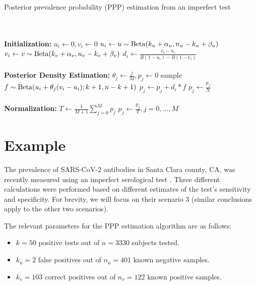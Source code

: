 \documentclass[dvipdfmx]{article}
\begin{document}
\begin{algorithm}[H]
  \caption{Posterior prevalence probability (PPP) estimation from an imperfect test}
  \label{alg:PPP}
    \begin{algorithmic}[1]
       \\ \\
      {\bf Initialization:}
      \State $u_i\gets 0, v_i\gets 0$
      \State $u_i \gets u \sim \operatorname{Beta}(k_u + \alpha_u, n_u-k_u+\beta_u)$
      \State $v_i \gets v \sim \operatorname{Beta}(k_v + \alpha_v, n_v-k_v+\beta_v)$
      \EndWhile
      \State $d_i \gets \frac{v_i-u_i}{B(1-u_i) - B(1-v_i)}$
      \EndFor \\\\
      {\bf Posterior Density Estimation:}
      \State $\theta_j\gets \frac{j}{M}, p_j\gets 0$
      \State sample $f \sim \operatorname{Beta}(u_i + \theta_j(v_i-u_i); k+1, n-k+1)$
      \State $p_j \gets p_j + d_i*f$
      \EndFor
      \State $p_j \gets \frac{p_j}{N}$
      \EndFor \\\\
      {\bf Normalization:}
      \State $T \gets \frac1{M+1}\sum_{j=0}^M p_j$
      \State $p_j\gets \frac{p_j}{T}, j=0,\dots,M$
    \end{algorithmic}
\end{algorithm}

\section{Example}
The prevalence of SARS-CoV-2 antibodies in Santa Clara county, CA, was
recently measured using an imperfect serological test
\cite{Bendavid2020.04.14.20062463}. Three different calculations were
performed based on different estimates of the test's sensitivity and
specificity. For brevity, we will focus on their scenario 3 (similar
conclusions apply to the other two scenarios).

The relevant parameters for the PPP estimation algorithm are as
follows:

\begin{itemize}
\item  $k=50$ positive tests out of $n=3330$ subjects tested.
\item $k_u=2$ false positives out of $n_u=401$ known negative samples.
\item $k_v=103$ correct positives out of $n_v=122$ known positive samples.
\end{itemize}
\end{document}
